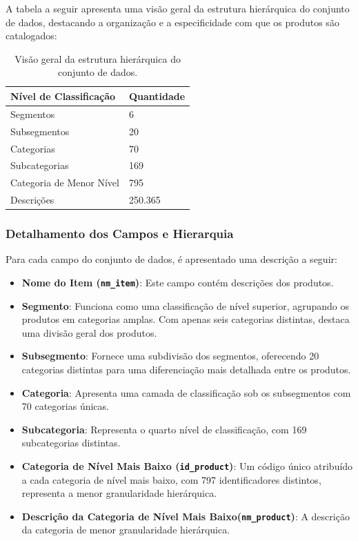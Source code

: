 A tabela a seguir apresenta uma visão geral da estrutura hierárquica do conjunto de dados, destacando a organização e a especificidade com que os produtos são catalogados:

\begin{table}[h]
\centering
\begin{tabular}{ll}
\hline
\textbf{Nível de Classificação} & \textbf{Quantidade} \\
\hline
Segmentos              & 6          \\
Subsegmentos           & 20         \\
Categorias             & 70         \\
Subcategorias          & 169        \\
Categoria de Menor Nível & 795      \\
Descrições             & 250.365    \\
\hline
\end{tabular}
\caption{Visão geral da estrutura hierárquica do conjunto de dados.}
\label{table:estrutura_hierarquica}
\end{table}

\subsubsection{Detalhamento dos Campos e Hierarquia}

Para cada campo do conjunto de dados, é apresentado uma descrição a seguir:
\begin{itemize}
    \item \textbf{Nome do Item (\texttt{nm\_item})}: Este campo contém descrições dos produtos.
    \item \textbf{Segmento}: Funciona como uma classificação de nível superior, agrupando os produtos em categorias amplas. Com apenas seis categorias distintas, destaca uma divisão geral dos produtos.
    \item \textbf{Subsegmento}: Fornece uma subdivisão dos segmentos, oferecendo 20 categorias distintas para uma diferenciação mais detalhada entre os produtos.
    \item \textbf{Categoria}: Apresenta uma camada de classificação sob os subsegmentos com 70 categorias únicas.
    \item \textbf{Subcategoria}: Representa o quarto nível de classificação, com 169 subcategorias distintas.
    \item \textbf{Categoria de Nível Mais Baixo (\texttt{id\_product})}: Um código único atribuído a cada categoria de nível mais baixo, com 797 identificadores distintos, representa a menor granularidade hierárquica.
    \item \textbf{Descrição da Categoria de Nível Mais Baixo(\texttt{nm\_product})}: A descrição da categoria de menor granularidade hierárquica.
\end{itemize}

